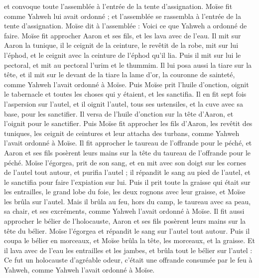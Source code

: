 \begin{multicols}{2}
et convoque toute l'assemblée à l'entrée de la tente d'assignation.
Moïse fit comme Yahweh lui avait ordonné ; et l'assemblée se rassembla à l'entrée de la tente d'assignation.
Moïse dit à l'assemblée : Voici ce que Yahweh a ordonné de faire.
Moïse fit approcher Aaron et ses fils, et les lava avec de l'eau.
Il mit sur Aaron la tunique, il le ceignit de la ceinture, le revêtit de la robe, mit sur lui l'éphod, et le ceignit avec la ceinture de l'éphod qu’il lia.
Puis il mit sur lui le pectoral, et mit au pectoral l’urim et le thummim.
Il lui posa aussi la tiare sur la tête, et il mit sur le devant de la tiare la lame d'or, la couronne de sainteté, comme Yahweh l'avait ordonné à Moïse.
Puis Moïse prit l'huile d'onction, oignit le tabernacle et toutes les choses qui y étaient, et les sanctifia.
Il en fit sept fois l’aspersion sur l'autel, et il oignit l'autel, tous ses ustensiles, et la cuve avec sa base, pour les sanctifier.
Il versa de l'huile d'onction sur la tête d'Aaron, et l'oignit pour le sanctifier.
Puis Moïse fit approcher les fils d'Aaron, les revêtit des tuniques, les ceignit de ceintures et leur attacha des turbans, comme Yahweh l'avait ordonné à Moïse.
Il fit approcher le taureau de l'offrande pour le péché, et Aaron et ses fils posèrent leurs mains sur la tête du taureau de l'offrande pour le péché.
Moïse l’égorgea, prit de son sang, et en mit avec son doigt sur les cornes de l'autel tout autour, et purifia l'autel ; il répandit le sang au pied de l'autel, et le sanctifia pour faire l’expiation sur lui.
Puis il prit toute la graisse qui était sur les entrailles, le grand lobe du foie, les deux rognons avec leur graisse, et Moïse les brûla sur l'autel.
Mais il brûla au feu, hors du camp, le taureau avec sa peau, sa chair, et ses excréments, comme Yahweh l'avait ordonné à Moïse.
Il fit aussi approcher le bélier de l'holocauste, Aaron et ses fils posèrent leurs mains sur la tête du bélier.
Moïse l'égorgea et répandit le sang sur l'autel tout autour.
Puis il coupa le bélier en morceaux, et Moïse brûla la tête, les morceaux, et la graisse.
Et il lava avec de l'eau les entrailles et les jambes, et brûla tout le bélier sur l'autel : Ce fut un holocauste d’agréable odeur, c'était une offrande consumée par le feu à Yahweh, comme Yahweh l'avait ordonné à Moïse.

\end{multicols}

